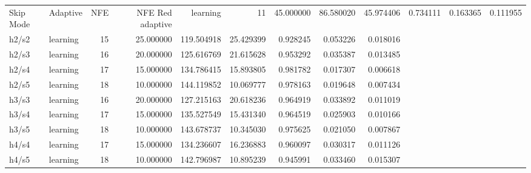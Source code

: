 \begin{tabular}{llrrrrrrr}
\toprule
Skip Mode & Adaptive & NFE & NFE Red %
\midrule
adaptive & learning & 11 & 45.000000 & 86.580020 & 45.974406 & 0.734111 & 0.163365 & 0.111955 \\
h2/s2 & learning & 15 & 25.000000 & 119.504918 & 25.429399 & 0.928245 & 0.053226 & 0.018016 \\
h2/s3 & learning & 16 & 20.000000 & 125.616769 & 21.615628 & 0.953292 & 0.035387 & 0.013485 \\
h2/s4 & learning & 17 & 15.000000 & 134.786415 & 15.893805 & 0.981782 & 0.017307 & 0.006618 \\
h2/s5 & learning & 18 & 10.000000 & 144.119852 & 10.069777 & 0.978163 & 0.019648 & 0.007434 \\
h3/s3 & learning & 16 & 20.000000 & 127.215163 & 20.618236 & 0.964919 & 0.033892 & 0.011019 \\
h3/s4 & learning & 17 & 15.000000 & 135.527549 & 15.431340 & 0.964519 & 0.025903 & 0.010166 \\
h3/s5 & learning & 18 & 10.000000 & 143.678737 & 10.345030 & 0.975625 & 0.021050 & 0.007867 \\
h4/s4 & learning & 17 & 15.000000 & 134.236607 & 16.236883 & 0.960097 & 0.030317 & 0.011126 \\
h4/s5 & learning & 18 & 10.000000 & 142.796987 & 10.895239 & 0.945991 & 0.033460 & 0.015307 \\
\bottomrule
\end{tabular}
